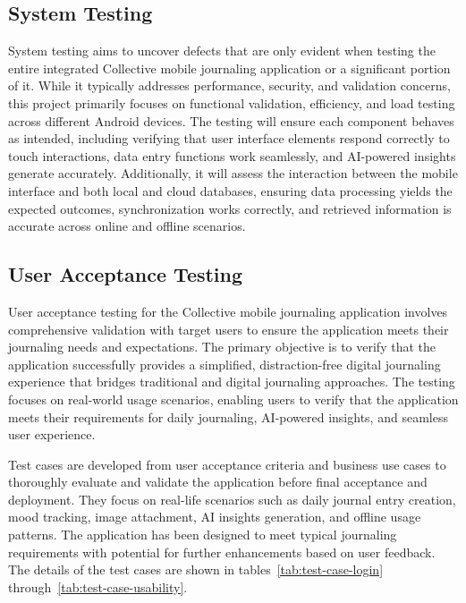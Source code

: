 \subsection{System Testing}\label{sec:systemTesting}

System testing aims to uncover defects that are only evident when testing the entire integrated Collective mobile journaling application or a significant portion of it. While it typically addresses performance, security, and validation concerns, this project primarily focuses on functional validation, efficiency, and load testing across different Android devices. The testing will ensure each component behaves as intended, including verifying that user interface elements respond correctly to touch interactions, data entry functions work seamlessly, and AI-powered insights generate accurately. Additionally, it will assess the interaction between the mobile interface and both local and cloud databases, ensuring data processing yields the expected outcomes, synchronization works correctly, and retrieved information is accurate across online and offline scenarios.

\subsection{User Acceptance Testing}\label{sec:userAcceptanceTesting}

User acceptance testing for the Collective mobile journaling application involves comprehensive validation with target users to ensure the application meets their journaling needs and expectations. The primary objective is to verify that the application successfully provides a simplified, distraction-free digital journaling experience that bridges traditional and digital journaling approaches. The testing focuses on real-world usage scenarios, enabling users to verify that the application meets their requirements for daily journaling, AI-powered insights, and seamless user experience.

Test cases are developed from user acceptance criteria and business use cases to thoroughly evaluate and validate the application before final acceptance and deployment. They focus on real-life scenarios such as daily journal entry creation, mood tracking, image attachment, AI insights generation, and offline usage patterns. The application has been designed to meet typical journaling requirements with potential for further enhancements based on user feedback. The details of the test cases are shown in tables~\ref{tab:test-case-login} through~\ref{tab:test-case-usability}.

